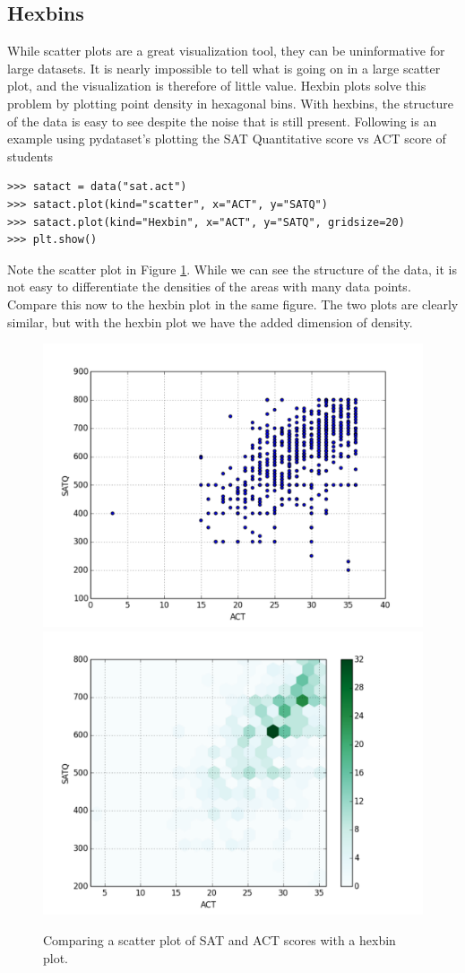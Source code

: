 \subsection*{Hexbins}
While scatter plots are a great visualization tool, they can be uninformative for large datasets.  It is nearly impossible to tell what is going on in a large scatter plot, and the visualization is therefore of little value.  Hexbin plots solve this problem by plotting point density in hexagonal bins.  With hexbins, the structure of the data is easy to see despite the noise that is still present.
Following is an example using pydataset's  plotting the SAT Quantitative score vs ACT score of students


\begin{lstlisting}
>>> satact = data("sat.act")
>>> satact.plot(kind="scatter", x="ACT", y="SATQ")
>>> satact.plot(kind="Hexbin", x="ACT", y="SATQ", gridsize=20)
>>> plt.show()
\end{lstlisting}

Note the scatter plot in Figure \ref{fig:comp}. While we can see the structure of the data, it is not easy to differentiate the densities of the areas with many data points. Compare this now to the hexbin plot in the same figure.  The two plots are clearly similar, but with the hexbin plot we have the added dimension of density.
\begin{figure}[H]
    \centering
    \includegraphics[width=.49\textwidth]{scatter.pdf}
    \includegraphics[width=.49\textwidth]{hexbin2.pdf}
    \caption{Comparing a scatter plot of SAT and ACT scores with a hexbin plot.}
    \label{fig:comp}
\end{figure}

